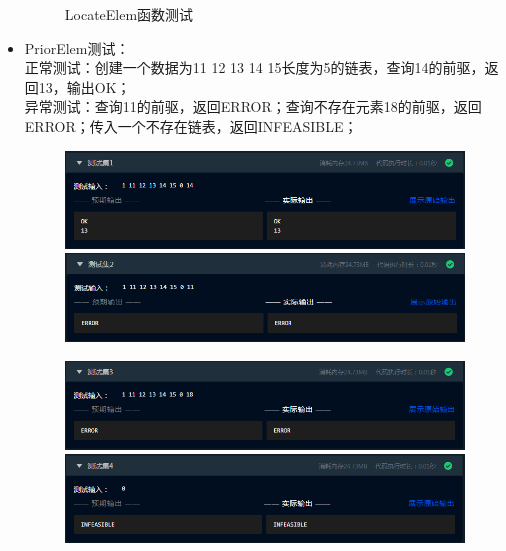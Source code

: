 \documentclass[supercite]{Experimental_Report}
\theoremstyle{definition}
\begin{document}
\begin{itemize}
\begin{figure}[htbp]
\begin{minipage}{0.9\linewidth}
		      \end{minipage}
		      \caption{LocateElem函数测试}
		      \label{fig1-10}
	      \end{figure}
	\item PriorElem测试：\\正常测试：创建一个数据为11 12 13 14 15长度为5的链表，查询14的前驱，返回13，输出OK；\\异常测试：查询11的前驱，返回ERROR；查询不存在元素18的前驱，返回ERROR；传入一个不存在链表，返回INFEASIBLE；
	      \begin{figure}[htbp]
		      \centering
		      \begin{minipage}{0.9\linewidth}
			      \centering
			      \includegraphics[width=0.9\linewidth]{images/test-19.png}
		      \end{minipage}
		      \begin{minipage}{0.9\linewidth}
			      \centering
			      \includegraphics[width=0.9\linewidth]{images/test-20.png}
		      \end{minipage}
	      \end{figure}
	      \newpage
	      \begin{figure}[htbp]
		      \centering
		      \begin{minipage}{0.9\linewidth}
			      \centering
			      \includegraphics[width=0.9\linewidth]{images/test-21.png}
		      \end{minipage}
		      \begin{minipage}{0.9\linewidth}
			      \centering
			      \includegraphics[width=0.9\linewidth]{images/test-22.png}

\end{minipage}
\end{figure}
\end{itemize}
\end{document}
